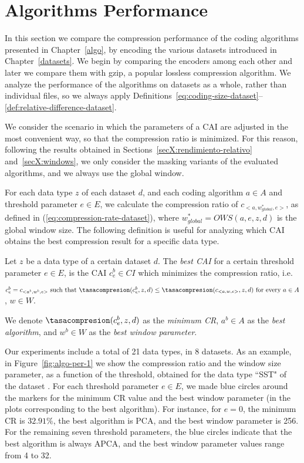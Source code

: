 
\section{Algorithms Performance}
\label{secX:codersmask}


In this section we compare the compression performance of the coding algorithms presented in Chapter~\ref{algo}, by encoding the various datasets introduced in Chapter~\ref{datasets}. We begin by comparing the encoders among each other and later we compare them with gzip, a popular lossless compression algorithm. We analyze the performance of the algorithms on datasets as a whole, rather than individual files, so we always apply Definitions~\ref{eq:coding-size-dataset}--\ref{def:relative-difference-dataset}.


We consider the scenario in which the parameters of a CAI are adjusted in the most convenient way, so that the compression ratio is minimized. For this reason, following the results obtained in Sections~\ref{secX:rendimiento-relativo} and~\ref{secX:windows}, we only consider the masking variants of the evaluated algorithms, and we always use the global window.


For each data type $z$ of each dataset $d$, and each coding algorithm $a \in A$ and threshold parameter $e \in E$, we calculate the compression ratio of $c_{<a, w_{global}^{*}, e>}$, as defined in (\ref{eq:compression-rate-dataset}), where $w_{global}^{*}=OWS(a, e, z, d)$ is the global window size. The following definition is useful for analyzing which CAI obtains the best compression result for a specific data type.


\begin{defcion}
\label{eq:bestcai}
Let $z$ be a data type of a certain dataset $d$. The \textit{best CAI} for a certain threshold parameter $e \in E$, is the CAI $c^{b}_{e} \in CI$ which minimizes the compression ratio, i.e.

\hspace{+10pt}$c^{b}_{e} = c_{<a^{b}, w^{b}, e>} \text{ such that } \tasacompresion(c^{b}_{e}, z, d) \leq \tasacompresion(c_{<a, w, e>}, z, d) \text{ for every } a \in A$, $w \in W$.

We denote $\tasacompresion(c^{b}_{e}, z, d)$ as the \textit{minimum CR}, $a^{b} \in A$ as the \textit{best algorithm}, and $w^{b} \in W$ as the \textit{best window parameter}.
\end{defcion}


Our experiments include a total of 21 data types, in 8 datasets. As an example, in Figure~\ref{fig:algo-per-1} we show the compression ratio and the window size parameter, as a function of the threshold, obtained for the data type ``SST" of the dataset \datasetelnino. For each threshold parameter $e \in E$, we made blue circles around the markers for the minimum CR value and the best window parameter (in the plots corresponding to the best algorithm). For instance, for $e=0$, the minimum CR is $32.91\%$, the best algorithm is PCA, and the best window parameter is 256. For the remaining seven threshold parameters, the blue circles indicate that the best algorithm is always APCA, and the best window parameter values range from 4 to 32.


